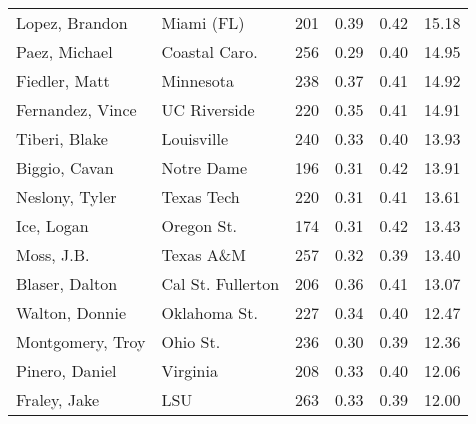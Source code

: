 \documentclass[12pt]{article}
\begin{document}
\begin{landscape}
\begin{table}
\begin{minipage}{.5\linewidth}
\begin{tabular}{llrrrr}
		Lopez, Brandon & Miami (FL) & 201 & 0.39 & 0.42 & 15.18 \\ 
		Paez, Michael & Coastal Caro. & 256 & 0.29 & 0.40 & 14.95 \\ 
		Fiedler, Matt & Minnesota & 238 & 0.37 & 0.41 & 14.92 \\ 
		Fernandez, Vince & UC Riverside & 220 & 0.35 & 0.41 & 14.91 \\ 
		Tiberi, Blake & Louisville & 240 & 0.33 & 0.40 & 13.93 \\ 
		Biggio, Cavan & Notre Dame & 196 & 0.31 & 0.42 & 13.91 \\ 
		Neslony, Tyler & Texas Tech & 220 & 0.31 & 0.41 & 13.61 \\ 
		Ice, Logan & Oregon St. & 174 & 0.31 & 0.42 & 13.43 \\ 
		Moss, J.B. & Texas A\&M & 257 & 0.32 & 0.39 & 13.40 \\ 
		Blaser, Dalton & Cal St. Fullerton & 206 & 0.36 & 0.41 & 13.07 \\ 
		Walton, Donnie & Oklahoma St. & 227 & 0.34 & 0.40 & 12.47 \\ 
		Montgomery, Troy & Ohio St. & 236 & 0.30 & 0.39 & 12.36 \\ 
		Pinero, Daniel & Virginia & 208 & 0.33 & 0.40 & 12.06 \\ 
		Fraley, Jake & LSU & 263 & 0.33 & 0.39 & 12.00 \\ 
		\hline
	\end{tabular}
\end{minipage}
\end{table}
\end{landscape}
\end{document}
